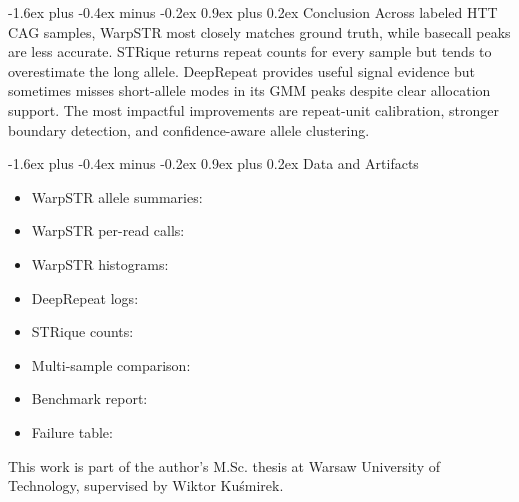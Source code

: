 \documentclass[sigconf]{acmart}
\makeatletter
\renewcommand\section{\@startsection{section}{1}{\z@}%
  {-1.6ex plus -0.4ex minus -0.2ex}%
  {0.9ex plus 0.2ex}%
  {\normalfont\large\bfseries}}
\makeatother
\begin{document}
\section{Conclusion}
Across labeled HTT CAG samples, WarpSTR most closely matches ground truth, while basecall peaks are less accurate. STRique returns repeat counts for every sample but tends to overestimate the long allele. DeepRepeat provides useful signal evidence but sometimes misses short-allele modes in its GMM peaks despite clear allocation support. The most impactful improvements are repeat-unit calibration, stronger boundary detection, and confidence-aware allele clustering.

\section{Data and Artifacts}
{\small
\sloppy
\begin{itemize}\raggedright
  \item WarpSTR allele summaries: 
  \item WarpSTR per-read calls: 
  \item WarpSTR histograms: 
  \item DeepRepeat logs: 
  \item STRique counts: 
  \item Multi-sample comparison: 
  \item Benchmark report: 
  \item Failure table: 
\end{itemize}
}

\begin{acks}
This work is part of the author's M.Sc. thesis at Warsaw University of Technology, supervised by Wiktor Ku\'smirek.
\end{acks}



\end{document}
